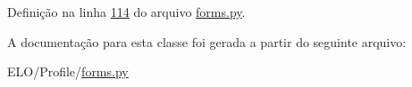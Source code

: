 Definição na linha \hyperlink{Profile_2forms_8py_source_l00114}{114} do arquivo \hyperlink{Profile_2forms_8py_source}{forms.\-py}.



A documentação para esta classe foi gerada a partir do seguinte arquivo\-:\begin{DoxyCompactItemize}
\item 
E\-L\-O/\-Profile/\hyperlink{Profile_2forms_8py}{forms.\-py}\end{DoxyCompactItemize}
